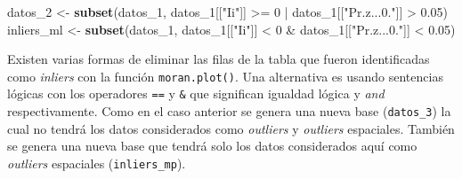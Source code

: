 \documentclass[11pt,b5paper,]{krantz}
\newenvironment{Shaded}{}{}
\newcommand{\KeywordTok}[1]{\textcolor[rgb]{0.00,0.44,0.13}{\textbf{#1}}}
\newcommand{\DecValTok}[1]{\textcolor[rgb]{0.25,0.63,0.44}{#1}}
\newcommand{\FloatTok}[1]{\textcolor[rgb]{0.25,0.63,0.44}{#1}}
\newcommand{\StringTok}[1]{\textcolor[rgb]{0.25,0.44,0.63}{#1}}
\newcommand{\OtherTok}[1]{\textcolor[rgb]{0.00,0.44,0.13}{#1}}
\newcommand{\OperatorTok}[1]{\textcolor[rgb]{0.40,0.40,0.40}{#1}}
\newcommand{\NormalTok}[1]{#1}
\begin{document}
\begin{Shaded}
\begin{Highlighting}[]
\NormalTok{datos_}\DecValTok{2}\NormalTok{ <-}
\StringTok{  }\KeywordTok{subset}\NormalTok{(datos_}\DecValTok{1}\NormalTok{, }
\NormalTok{         datos_}\DecValTok{1}\NormalTok{[[}\StringTok{"Ii"}\NormalTok{]] }\OperatorTok{>=}\StringTok{ }\DecValTok{0} \OperatorTok{|}\StringTok{ }
\StringTok{           }\NormalTok{datos_}\DecValTok{1}\NormalTok{[[}\StringTok{"Pr.z...0."}\NormalTok{]] }\OperatorTok{>}\StringTok{ }\FloatTok{0.05}\NormalTok{)}
\NormalTok{inliers_ml <-}
\StringTok{  }\KeywordTok{subset}\NormalTok{(datos_}\DecValTok{1}\NormalTok{, }
\NormalTok{         datos_}\DecValTok{1}\NormalTok{[[}\StringTok{"Ii"}\NormalTok{]] }\OperatorTok{<}\StringTok{ }\DecValTok{0} \OperatorTok{&}
\StringTok{           }\NormalTok{datos_}\DecValTok{1}\NormalTok{[[}\StringTok{"Pr.z...0."}\NormalTok{]] }\OperatorTok{<}\StringTok{ }\FloatTok{0.05}\NormalTok{)}
\end{Highlighting}
\end{Shaded}

Existen varias formas de eliminar las filas de la tabla que fueron
identificadas como \emph{inliers} con la función \texttt{moran.plot()}.
Una alternativa es usando sentencias lógicas con los operadores
\texttt{==} y \texttt{\&} que significan igualdad lógica y \emph{and}
respectivamente. Como en el caso anterior se genera una nueva base
(\texttt{datos\_3}) la cual no tendrá los datos considerados como
\emph{outliers} y \emph{outliers} espaciales. También se genera una
nueva base que tendrá solo los datos considerados aquí como
\emph{outliers} espaciales (\texttt{inliers\_mp}).

\begin{Shaded}
\end{Shaded}
\end{document}
